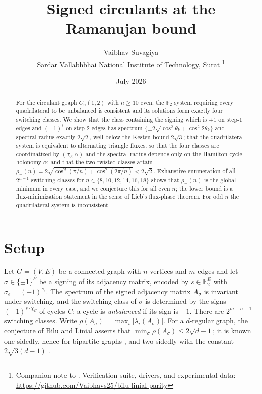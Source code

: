 \documentclass[11pt]{article}
\title{Signed circulants at the Ramanujan bound}
\author{Vaibhav Suvagiya\\
\small Sardar Vallabhbhai National Institute of Technology, Surat
\thanks{Companion note to \cite{companionA}. Verification suite,
drivers, and experimental data:
\url{https://github.com/Vaibhavs25/bilu-linial-parity}}}
\date{July 2026}
\theoremstyle{remark}
\newcommand{\F}{\mathbb{F}}
\newcommand{\rhomax}{\rho}
\begin{document}
\maketitle

\begin{abstract}
For the circulant graph $C_n(1,2)$ with $n\ge10$ even, the $\F_2$ system
requiring every quadrilateral to be unbalanced is consistent and its
solutions form exactly four switching classes. We show that the class
containing the signing which is $+1$ on step-$1$ edges and $(-1)^i$ on
step-$2$ edges has spectrum
$\{\pm2\sqrt{\cos^2\theta_k+\cos^2 2\theta_k}\}$ and spectral radius
exactly $2\sqrt2$, well below the Kesten bound $2\sqrt3$; that the
quadrilateral system is equivalent to alternating triangle fluxes, so
that the four classes are coordinatized by $(\tau_0,\alpha)$ and the
spectral radius depends only on the Hamilton-cycle holonomy $\alpha$;
and that the two twisted classes attain
$\rho_-(n)=2\sqrt{\cos^2(\pi/n)+\cos^2(2\pi/n)}<2\sqrt2$. Exhaustive
enumeration of all $2^{n+1}$ switching classes for
$n\in\{8,10,12,14,16,18\}$ shows that $\rho_-(n)$ is the global
minimum in every case, and we conjecture this for all even $n$; the
lower bound is a flux-minimization statement in the sense of Lieb's
flux-phase theorem. For odd $n$ the quadrilateral system is
inconsistent.
\end{abstract}

\section{Setup}

Let $G=(V,E)$ be a connected graph with $n$ vertices and $m$ edges and
let $\sigma\in\{\pm1\}^E$ be a signing of its adjacency matrix,
encoded by $s\in\F_2^E$ with $\sigma_e=(-1)^{s_e}$. The spectrum of
the signed adjacency matrix $A_\sigma$ is invariant under switching,
and the switching class of $\sigma$ is determined by the signs
$(-1)^{s\cdot\chi_C}$ of cycles $C$; a cycle is \emph{unbalanced} if
its sign is $-1$. There are $2^{m-n+1}$ switching classes. Write
$\rhomax(A_\sigma)=\max_i|\lambda_i(A_\sigma)|$. For a $d$-regular
graph, the conjecture of Bilu and Linial \cite{bilulinial06} asserts
that $\min_\sigma\rhomax(A_\sigma)\le2\sqrt{d-1}$; it is known
one-sidedly, hence for bipartite graphs \cite{mss15}, and two-sidedly
with the constant $2\sqrt{3(d-1)}$ \cite{xuzhang26}.
\end{document}
